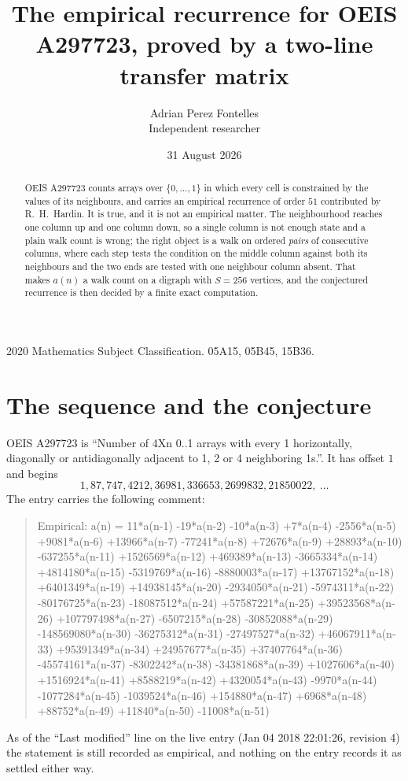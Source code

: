 \documentclass[11pt,a4paper]{article}
\title{The empirical recurrence for OEIS A297723, proved by a two-line transfer matrix}
\author{Adrian Perez Fontelles\\ \small Independent researcher}
\date{31 August 2026}
\theoremstyle{plain}
\theoremstyle{definition}
\begin{document}
\maketitle

\begin{abstract}
OEIS A297723 counts arrays over $\{0,\dots,1\}$ in which every cell is constrained by the
values of its neighbours, and carries an empirical recurrence of order $51$ contributed
by R.~H.~Hardin. It is true, and it is not an empirical matter. The neighbourhood reaches one
column up and one column down, so a single column is not enough state and a plain walk count
is wrong; the right object is a walk on ordered \emph{pairs} of consecutive columns, where
each step tests the condition on the middle column against both its neighbours and the two
ends are tested with one neighbour column absent. That makes $a(n)$ a walk count on a digraph
with $S=256$ vertices, and the conjectured recurrence is then decided by a finite exact
computation.
\end{abstract}

\noindent\small 2020 Mathematics Subject Classification. 05A15, 05B45, 15B36.\normalsize

\section{The sequence and the conjecture}

OEIS A297723 is ``Number of 4Xn 0..1 arrays with every 1 horizontally, diagonally or antidiagonally adjacent to 1, 2 or 4 neighboring 1s.''. It has offset $1$ and begins
\[
1, 87, 747, 4212, 36981, 336653, 2699832, 21850022,\ \dots
\]
The entry carries the following comment:
\begin{quote}\small
Empirical: a(n) = 11*a(n-1) -19*a(n-2) -10*a(n-3) +7*a(n-4) -2556*a(n-5) +9081*a(n-6) +13966*a(n-7) -77241*a(n-8) +72676*a(n-9) +28893*a(n-10) -637255*a(n-11) +1526569*a(n-12) +469389*a(n-13) -3665334*a(n-14) +4814180*a(n-15) -5319769*a(n-16) -8880003*a(n-17) +13767152*a(n-18) +6401349*a(n-19) +14938145*a(n-20) -2934050*a(n-21) -5974311*a(n-22) -80176725*a(n-23) -18087512*a(n-24) +57587221*a(n-25) +39523568*a(n-26) +107797498*a(n-27) -6507215*a(n-28) -30852088*a(n-29) -148569080*a(n-30) -36275312*a(n-31) -27497527*a(n-32) +46067911*a(n-33) +95391349*a(n-34) +24957677*a(n-35) +37407764*a(n-36) -45574161*a(n-37) -8302242*a(n-38) -34381868*a(n-39) +1027606*a(n-40) +1516924*a(n-41) +8588219*a(n-42) +4320054*a(n-43) -9970*a(n-44) -1077284*a(n-45) -1039524*a(n-46) +154880*a(n-47) +6968*a(n-48) +88752*a(n-49) +11840*a(n-50) -11008*a(n-51)
\end{quote}
As of the ``Last modified'' line on the live entry (Jan 04 2018 22:01:26, revision 4) the statement is
still recorded as empirical, and nothing on the entry records it as settled either way.
\end{document}

